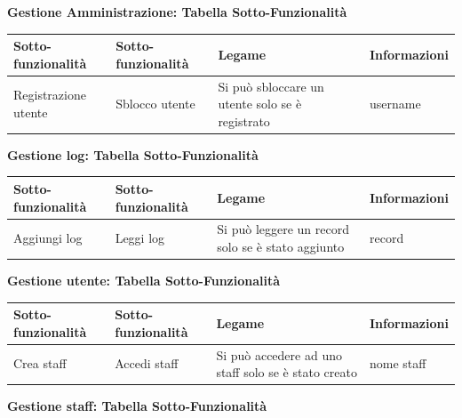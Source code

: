 \documentclass[a4paper]{article}
\begin{document}
\textbf{Gestione Amministrazione: Tabella Sotto-Funzionalità}

\begin{center}
    \begin{tabularx}{1\textwidth}{|X|X|X|X|}
    \hline
    \textbf{Sotto-funzionalità} & \textbf{Sotto-funzionalità} & \textbf{Legame} & \textbf{Informazioni}\\
    \hline
    \hline
    Registrazione utente & Sblocco utente & Si può sbloccare un utente solo se è registrato & username\\
    \hline
    \end{tabularx}
\end{center}

\textbf{Gestione log: Tabella Sotto-Funzionalità}

\begin{center}
    \begin{tabularx}{1\textwidth}{|X|X|X|X|}
    \hline
    \textbf{Sotto-funzionalità} & \textbf{Sotto-funzionalità} & \textbf{Legame} & \textbf{Informazioni}\\
    \hline
    \hline
    Aggiungi log & Leggi log & Si può leggere un record solo se è stato aggiunto & record\\
    \hline
    \end{tabularx}
\end{center}

\textbf{Gestione utente: Tabella Sotto-Funzionalità}

\begin{center}
    \begin{tabularx}{1\textwidth}{|X|X|X|X|}
    \hline
    \textbf{Sotto-funzionalità} & \textbf{Sotto-funzionalità} & \textbf{Legame} & \textbf{Informazioni}\\
    \hline
    \hline
    Crea staff & Accedi staff & Si può accedere ad uno staff solo se è stato creato & nome staff\\
    \hline
    \end{tabularx}
\end{center}

\textbf{Gestione staff: Tabella Sotto-Funzionalità}
\end{document}
